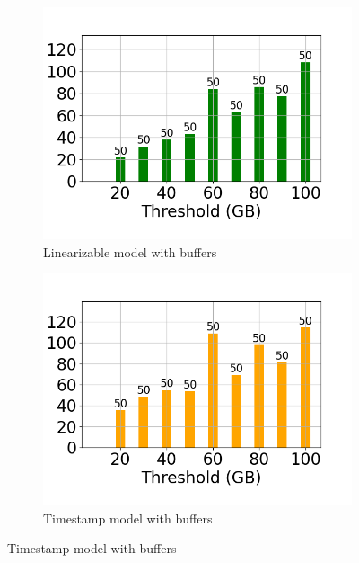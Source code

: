 \begin{figure}
	\centering
	\begin{subfigure}[c]{0.48\textwidth}
		\includegraphics[width=1\textwidth]   {figures/Experiments/Dynamic/Progress/5/average_query_time_per_batch_version_999777015_10485760_10_delay[5].png}
		\caption{Linearizable model with buffers}
		\label{fig:progress-queries-5-logical}
	\end{subfigure}
	\begin{subfigure}[c]{0.48\textwidth}
		\includegraphics[width=1\textwidth]   {figures/Experiments/Dynamic/Progress/5/average_query_time_per_batch_version_999777018_10485760_10_delay[5].png}
		\caption{Timestamp model with buffers}

\end{subfigure}
\end{figure}

